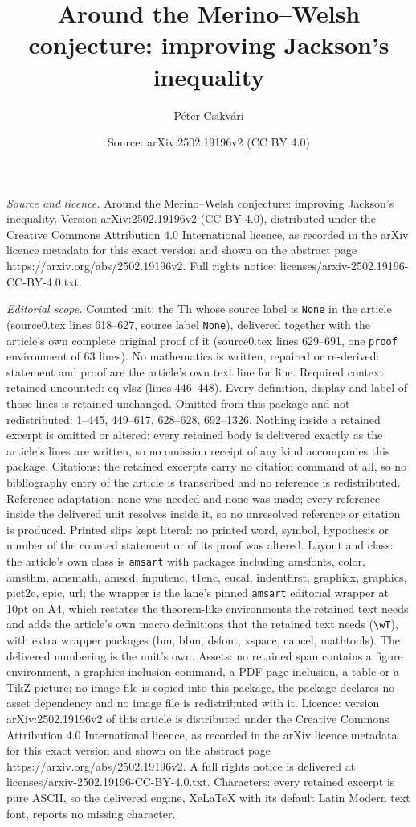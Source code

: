 \documentclass[10pt,a4paper]{amsart}
\title[Around the Merino--Welsh conjecture: improving Jackson's ine]{Around the Merino--Welsh conjecture: improving Jackson's inequality}
\author{P\'eter Csikv\'ari}
\date{Source: arXiv:2502.19196v2 (CC BY 4.0)}
\begin{document}
\maketitle

\noindent\emph{Source and licence.} Around the Merino--Welsh conjecture: improving Jackson's inequality. Version arXiv:2502.19196v2 (CC BY 4.0), distributed under the Creative Commons Attribution 4.0 International licence, as recorded in the arXiv licence metadata for this exact version and shown on the abstract page https://arxiv.org/abs/2502.19196v2. Full rights notice: licenses/arxiv-2502.19196-CC-BY-4.0.txt.\par\smallskip

\noindent\textit{Editorial scope.} Counted unit: the Th whose source label is \texttt{None} in the article (source0.tex lines 618--627, source label \texttt{None}), delivered together with the article's own complete original proof of it (source0.tex lines 629--691, one \texttt{proof} environment of 63 lines). No mathematics is written, repaired or re-derived: statement and proof are the article's own text line for line. Required context retained uncounted: eq-vlsz (lines 446--448). Every definition, display and label of those lines is retained unchanged. Omitted from this package and not redistributed: 1--445, 449--617, 628--628, 692--1326. Nothing inside a retained excerpt is omitted or altered: every retained body is delivered exactly as the article's lines are written, so no omission receipt of any kind accompanies this package. Citations: the retained excerpts carry no citation command at all, so no bibliography entry of the article is transcribed and no reference is redistributed. Reference adaptation: none was needed and none was made; every reference inside the delivered unit resolves inside it, so no unresolved reference or citation is produced. Printed slips kept literal: no printed word, symbol, hypothesis or number of the counted statement or of its proof was altered. Layout and class: the article's own class is \texttt{amsart} with packages including amsfonts, color, amsthm, amsmath, amscd, inputenc, t1enc, eucal, indentfirst, graphicx, graphics, pict2e, epic, url; the wrapper is the lane's pinned \texttt{amsart} editorial wrapper at 10pt on A4, which restates the theorem-like environments the retained text needs and adds the article's own macro definitions that the retained text needs (\texttt{\textbackslash wT}), with extra wrapper packages (bm, bbm, dsfont, xspace, cancel, mathtools). The delivered numbering is the unit's own. Assets: no retained span contains a figure environment, a graphics-inclusion command, a PDF-page inclusion, a table or a TikZ picture; no image file is copied into this package, the package declares no asset dependency and no image file is redistributed with it. Licence: version arXiv:2502.19196v2 of this article is distributed under the Creative Commons Attribution 4.0 International licence, as recorded in the arXiv licence metadata for this exact version and shown on the abstract page https://arxiv.org/abs/2502.19196v2. A full rights notice is delivered at licenses/arxiv-2502.19196-CC-BY-4.0.txt. Characters: every retained excerpt is pure ASCII, so the delivered engine, XeLaTeX with its default Latin Modern text font, reports no missing character.
\end{document}
